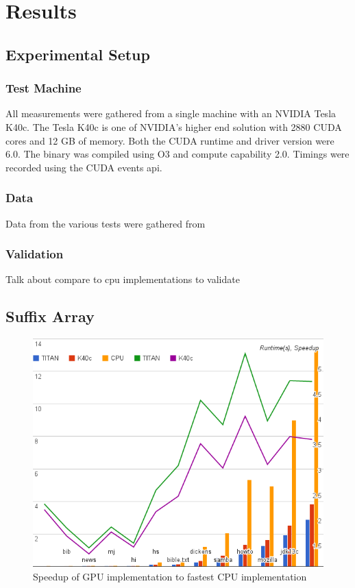 \chapter{Results}
\label{chap:results}

\section{Experimental Setup}
\subsection{Test Machine}
All measurements were gathered from a single machine with an NVIDIA Tesla K40c.
The Tesla K40c is one of NVIDIA's higher end solution with 2880 CUDA cores and 12 GB of memory.
Both the CUDA runtime and driver version were 6.0.
The binary was compiled using O3 and compute capability 2.0.
Timings were recorded using the CUDA events api.

\subsection{Data}

Data from the various tests were gathered from 

\subsection{Validation}

Talk about compare to cpu implementations to validate

\section{Suffix Array}

\begin{figure}[ht!]
\centering
\includegraphics[width=1.0\textwidth]{images/saresult.png}
\caption{Speedup of GPU implementation to fastest CPU implementation}
\label{fig:saresult}
\end{figure}


